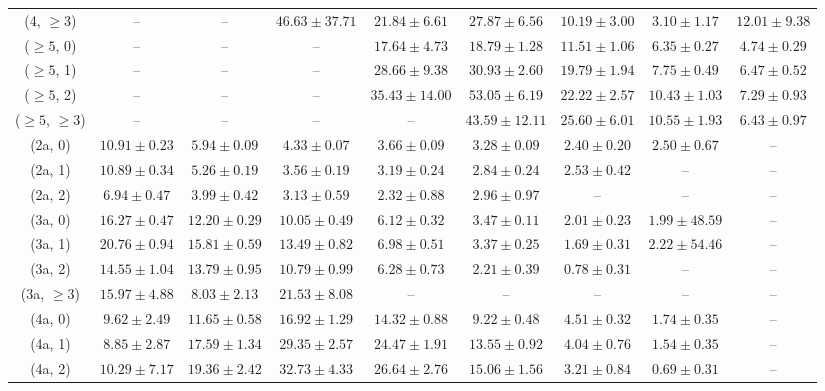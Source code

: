 \begin{table}[h!]
{\begin{tabular}{ccccccccc}
	(4, $\ge3$) & -- & -- & $46.63\pm 37.71$ & $21.84\pm 6.61$ & $27.87\pm 6.56$ & $10.19\pm 3.00$ & $3.10\pm 1.17$ & $12.01\pm 9.38$ \\[0.5ex] 
	($\ge5$, 0) & -- & -- & -- & $17.64\pm 4.73$ & $18.79\pm 1.28$ & $11.51\pm 1.06$ & $6.35\pm 0.27$ & $4.74\pm 0.29$ \\[0.5ex] 
	($\ge5$, 1) & -- & -- & -- & $28.66\pm 9.38$ & $30.93\pm 2.60$ & $19.79\pm 1.94$ & $7.75\pm 0.49$ & $6.47\pm 0.52$ \\[0.5ex] 
	($\ge5$, 2) & -- & -- & -- & $35.43\pm 14.00$ & $53.05\pm 6.19$ & $22.22\pm 2.57$ & $10.43\pm 1.03$ & $7.29\pm 0.93$ \\[0.5ex] 
	($\ge5$, $\ge3$) & -- & -- & -- & -- & $43.59\pm 12.11$ & $25.60\pm 6.01$ & $10.55\pm 1.93$ & $6.43\pm 0.97$ \\[0.5ex] 
	(2a, 0) & $10.91\pm 0.23$ & $5.94\pm 0.09$ & $4.33\pm 0.07$ & $3.66\pm 0.09$ & $3.28\pm 0.09$ & $2.40\pm 0.20$ & $2.50\pm 0.67$ & -- \\[0.5ex] 
	(2a, 1) & $10.89\pm 0.34$ & $5.26\pm 0.19$ & $3.56\pm 0.19$ & $3.19\pm 0.24$ & $2.84\pm 0.24$ & $2.53\pm 0.42$ & -- & -- \\[0.5ex] 
	(2a, 2) & $6.94\pm 0.47$ & $3.99\pm 0.42$ & $3.13\pm 0.59$ & $2.32\pm 0.88$ & $2.96\pm 0.97$ & -- & -- & -- \\[0.5ex] 
	(3a, 0) & $16.27\pm 0.47$ & $12.20\pm 0.29$ & $10.05\pm 0.49$ & $6.12\pm 0.32$ & $3.47\pm 0.11$ & $2.01\pm 0.23$ & $1.99\pm 48.59$ & -- \\[0.5ex] 
	(3a, 1) & $20.76\pm 0.94$ & $15.81\pm 0.59$ & $13.49\pm 0.82$ & $6.98\pm 0.51$ & $3.37\pm 0.25$ & $1.69\pm 0.31$ & $2.22\pm 54.46$ & -- \\[0.5ex] 
	(3a, 2) & $14.55\pm 1.04$ & $13.79\pm 0.95$ & $10.79\pm 0.99$ & $6.28\pm 0.73$ & $2.21\pm 0.39$ & $0.78\pm 0.31$ & -- & -- \\[0.5ex] 
	(3a, $\ge3$) & $15.97\pm 4.88$ & $8.03\pm 2.13$ & $21.53\pm 8.08$ & -- & -- & -- & -- & -- \\[0.5ex] 
	(4a, 0) & $9.62\pm 2.49$ & $11.65\pm 0.58$ & $16.92\pm 1.29$ & $14.32\pm 0.88$ & $9.22\pm 0.48$ & $4.51\pm 0.32$ & $1.74\pm 0.35$ & -- \\[0.5ex] 
	(4a, 1) & $8.85\pm 2.87$ & $17.59\pm 1.34$ & $29.35\pm 2.57$ & $24.47\pm 1.91$ & $13.55\pm 0.92$ & $4.04\pm 0.76$ & $1.54\pm 0.35$ & -- \\[0.5ex] 
	(4a, 2) & $10.29\pm 7.17$ & $19.36\pm 2.42$ & $32.73\pm 4.33$ & $26.64\pm 2.76$ & $15.06\pm 1.56$ & $3.21\pm 0.84$ & $0.69\pm 0.31$ & -- \\[0.5ex] 

\end{tabular}}
\end{table}
